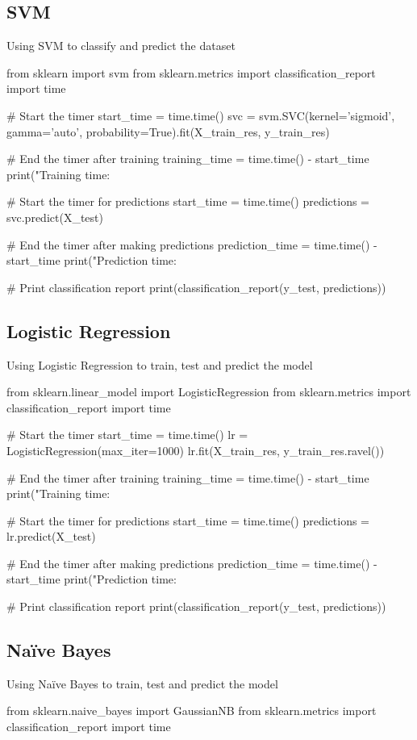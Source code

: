 \documentclass{josis}
\begin{document}
{\subsection{SVM}
Using SVM to classify and predict the dataset
\begin{python}
from sklearn import svm
from sklearn.metrics import classification_report
import time

# Start the timer
start_time = time.time()
svc = svm.SVC(kernel='sigmoid', gamma='auto', probability=True).fit(X_train_res, y_train_res)

# End the timer after training
training_time = time.time() - start_time
print("Training time: %

# Start the timer for predictions
start_time = time.time()
predictions = svc.predict(X_test)

# End the timer after making predictions
prediction_time = time.time() - start_time
print("Prediction time: %

# Print classification report
print(classification_report(y_test, predictions))
\end{python}

\subsection{Logistic Regression}
Using Logistic Regression to train, test and predict the model
\begin{python}
from sklearn.linear_model import LogisticRegression
from sklearn.metrics import classification_report
import time

# Start the timer
start_time = time.time()
lr = LogisticRegression(max_iter=1000)
lr.fit(X_train_res, y_train_res.ravel())

# End the timer after training
training_time = time.time() - start_time
print("Training time: %

# Start the timer for predictions
start_time = time.time()
predictions = lr.predict(X_test)

# End the timer after making predictions
prediction_time = time.time() - start_time
print("Prediction time: %

# Print classification report
print(classification_report(y_test, predictions))
\end{python}

\subsection{Naïve Bayes}
Using Naïve Bayes to train, test and predict the model
\begin{python}
from sklearn.naive_bayes import GaussianNB
from sklearn.metrics import classification_report
import time


\end{python}}
\end{document}
